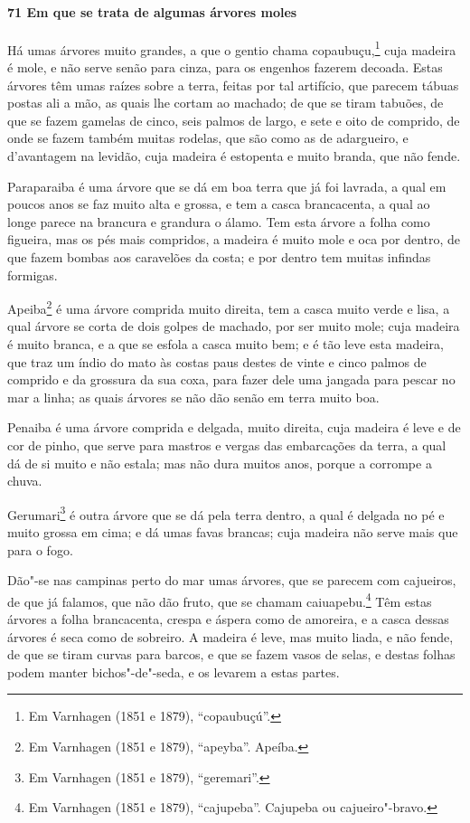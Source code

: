 \paragraph{71 Em que se trata de algumas árvores moles}

Há umas árvores muito grandes, a que o gentio chama copaubuçu,\footnote{ Em Varnhagen
(1851 e 1879), ``copaubuçú''.} cuja madeira é mole, e não serve senão para cinza, para os
engenhos fazerem decoada. Estas árvores têm umas raízes sobre a terra, feitas por tal
artifício, que parecem tábuas postas ali a mão, as quais lhe cortam ao machado; de que se
tiram tabuões, de que se fazem gamelas de cinco, seis palmos de largo, e sete e oito de
comprido, de onde se fazem também muitas rodelas, que são como as de adargueiro, e
d'avantagem na levidão, cuja madeira é estopenta e muito branda, que não fende.

Paraparaiba é uma árvore que se dá em boa terra que já foi lavrada, a qual em poucos anos
se faz muito alta e grossa, e tem a casca brancacenta, a qual ao longe parece na brancura
e grandura o álamo. Tem esta árvore a folha como figueira, mas os pés mais compridos, a
madeira é muito mole e oca por dentro, de que fazem bombas aos caravelões da costa; e por
dentro tem muitas infindas formigas.

Apeiba\footnote{ Em Varnhagen (1851 e 1879), ``apeyba''. Apeíba.} é uma árvore comprida
muito direita, tem a casca muito verde e lisa, a qual árvore se corta de dois golpes de
machado, por ser muito mole; cuja madeira é muito branca, e a que se esfola a casca muito
bem; e é tão leve esta madeira, que traz um índio do mato às costas paus destes de vinte e
cinco palmos de comprido e da grossura da sua coxa, para fazer dele uma jangada para
pescar no mar a linha; as quais árvores se não dão senão em terra muito boa.

Penaiba é uma árvore comprida e delgada, muito direita, cuja madeira é leve e de cor de
pinho, que serve para mastros e vergas das embarcações da terra, a qual dá de si muito e
não estala; mas não dura muitos anos, porque a corrompe a chuva.

Gerumari\footnote{ Em Varnhagen (1851 e 1879), ``geremari''.} é outra árvore que se dá
pela terra dentro, a qual é delgada no pé e muito grossa em cima; e dá umas favas brancas;
cuja madeira não serve mais que para o fogo.

Dão"-se nas campinas perto do mar umas árvores, que se parecem com cajueiros, de que já
falamos, que não dão fruto, que se chamam caiuapebu.\footnote{ Em Varnhagen (1851 e 1879),
``cajupeba''. Cajupeba ou cajueiro"-bravo.} Têm estas árvores a folha brancacenta, crespa e
áspera como de amoreira, e a casca dessas árvores é seca como de sobreiro. A madeira é
leve, mas muito liada, e não fende, de que se tiram curvas para barcos, e que se fazem
vasos de selas, e destas folhas podem manter bichos"-de"-seda, e os levarem a estas partes.

